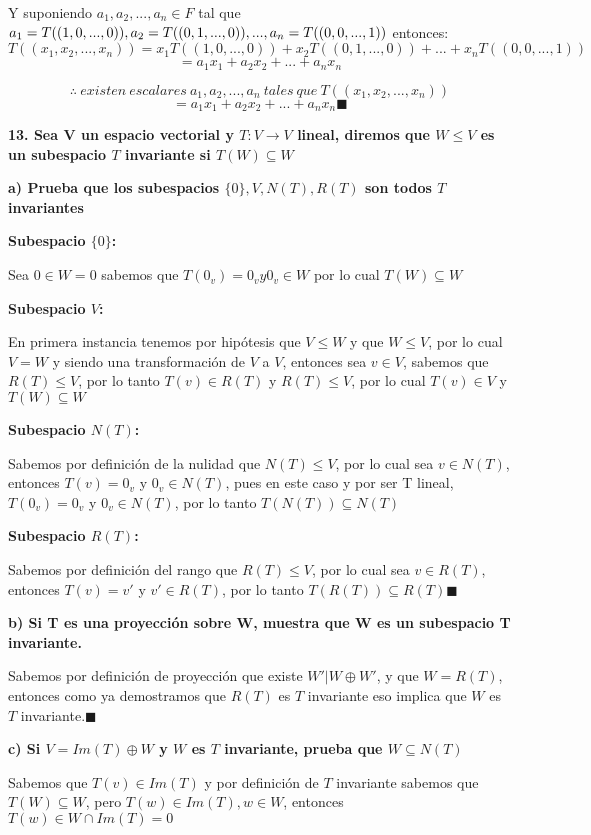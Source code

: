 \documentclass{article}
\begin{document}
Y suponiendo $a_1,a_2,...,a_n \in F$ tal que $\\ a_1=T((1,0,...,0)), a_2=T((0,1,...,0)), ..., a_n=T((0,0,...,1))$ entonces: $$T((x_1,x_2,...,x_n))=x_1T((1,0,...,0))+x_2T((0,1,...,0))+...+x_nT((0,0,...,1))$$
$$=a_1x_1+a_2x_2+...+a_nx_n$$

$$\therefore\ existen\ escalares\ a_1,a_2,...,a_n\ tales\ que\ T((x_1,x_2,...,x_n))$$$$=a_1x_1+a_2x_2+...+a_nx_n\blacksquare$$

\textbf{13. Sea V un espacio vectorial y $T: V \rightarrow V$ lineal, diremos que $W\leq V$ es un subespacio $T$ invariante si $T(W)\subseteq W$}

\textbf{a) Prueba que los subespacios $\{0\}, V, N(T), R(T)$ son todos $T$ invariantes}

\textbf{Subespacio $\{0\}$:}

Sea $0 \in W={0}$ sabemos que $T(0_{v})=0_{v} y 0_{v} \in W$ por lo cual $T(W)\subseteq W$ 

\textbf{Subespacio $V$:}

En primera instancia tenemos por hipótesis que $V\leq W$ y que $W\leq V$, por lo cual $V=W$ y siendo una transformación de $V$ a $V$, entonces sea $v\in V$, sabemos que $R(T)\leq V$, por lo tanto
$T(v)\in R(T)$ y $R(T)\leq V$, por lo cual $T(v)\in V$ y $T(W)\subseteq W$

\textbf{Subespacio $N(T)$:}

Sabemos por definición de la nulidad que $N(T)\leq V$, por lo cual sea $v\in N(T)$, entonces $T(v)=0_{v}$ y $0_{v}\in N(T)$, pues en este caso y por ser T lineal, $T(0_{v})=0_{v}$ y $0_{v}\in N(T)$, por lo tanto $T(N(T))\subseteq N(T)$

\textbf{Subespacio $R(T)$:}

Sabemos por definición del rango que $R(T)\leq V$, por lo cual sea $v\in R(T)$, entonces $T(v)=v'$ y $v'\in R(T)$,
por lo tanto $T(R(T))\subseteq R(T)\blacksquare$

\pagebreak
\textbf{b) Si T es una proyección sobre W, muestra que W es un subespacio T invariante.}

Sabemos por definición de proyección que existe $W' | W\oplus W'$, y que $W=R(T)$, entonces como ya demostramos que $R(T)$ es $T$ invariante eso implica que $W$ es $T$ invariante.$\blacksquare$

\textbf{c) Si $V=Im(T)\oplus W$ y $W$ es $T$ invariante, prueba que $W\subseteq N(T)$}

Sabemos que $T(v)\in Im(T)$ y por definición de $T$ invariante sabemos que $T(W)\subseteq W$, pero $T(w) \in Im(T), w\in W$, entonces $T(w)\in W \cap Im(T)={0}$
\end{document}
